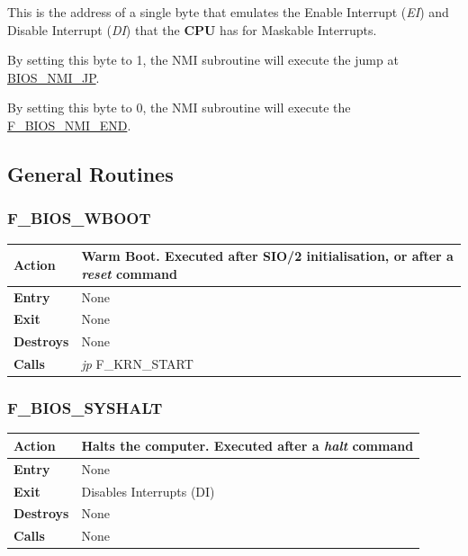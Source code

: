 \documentclass[a4paper,11pt]{article}
\begin{document}
    This is the address of a single byte that emulates the Enable Interrupt
    (\textit{EI}) and Disable Interrupt (\textit{DI}) that the \textbf{CPU}
    has for Maskable Interrupts.

    By setting this byte to 1, the NMI subroutine will execute the jump at
    \hyperref[func:fbiosnmijp]{BIOS\_NMI\_JP}.

    By setting this byte to 0, the NMI subroutine will execute the
    \hyperref[func:fbiosnmiend]{F\_BIOS\_NMI\_END}.

    \subsection{General Routines}

        \subsubsection{F\_BIOS\_WBOOT}
        \label{func:fbioswboot}
        \begin{tabular}{l p{9cm}}
            \hline\textbf{Action}
            & Warm Boot. Executed after \textbf{SIO/2} initialisation, or after a
            \textit{reset} command \\
            \hline\textbf{Entry} & None \\
            \hline\textbf{Exit} & None \\
            \hline\textbf{Destroys} & None \\
            \hline\textbf{Calls} & \textit{jp} F\_KRN\_START \\
            \hline
        \end{tabular}

        \subsubsection{F\_BIOS\_SYSHALT}
        \label{func:fbiossyshalt}
        \begin{tabular}{l p{9cm}}
            \hline\textbf{Action}
            & Halts the computer. Executed after a \textit{halt} command \\
            \hline\textbf{Entry} & None \\
            \hline\textbf{Exit} & Disables Interrupts (DI) \\
            \hline\textbf{Destroys} & None \\
            \hline\textbf{Calls} & None \\
            \hline
        \end{tabular}
\end{document}
